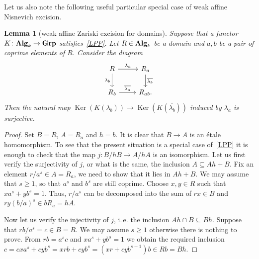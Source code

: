 \documentclass[oneside, 11pt]{amsart} \pdfoutput=1
\newcommand{\Ker}{\mathop{\mathrm{Ker}}\nolimits}
\numberwithin{equation}{section}
\newtheorem{lemma}{Lemma} \numberwithin{lemma}{section}
\theoremstyle{definition}
\newcommand{\catname}[1]{{\normalfont\textbf{#1}}} %
\begin{document}
Let us also note the following useful particular special case of weak affine Nisnevich excision.
\begin{lemma}[weak affine Zariski excision for domains]
	\label{zgl} Suppose that a functor $K\colon \catname{Alg}_k \to \catname{Grp}$ satisfies~\ref{LPP}. Let $R \in \catname{Alg}_k$ be a domain and $a, b$ be a pair of coprime elements of $R$. Consider the diagram
$$\begin{tikzcd}
	R \ar{r}{\lambda_a} \ar{d}[swap]{\lambda_b} & R_a \ar{d}{\overline{\lambda_b}}\\
	R_b \ar{r}{\overline{\lambda_a}} & R_{ab}.
\end{tikzcd}$$
	Then the natural map $\Ker(K(\lambda_b)) \to \Ker(K(\overline{\lambda_b}))$ induced by $\lambda_a$ is surjective.
\end{lemma}
\begin{proof}
	Set $B=R$, $A=R_a$ and $h=b$. It is clear that $B \to A$ is an {\'e}tale homomorphism. To see that the present situation is a special case of~\ref{LPP} it is enough to  check that the map $j\colon B/hB \to A/hA$ is an isomorphism. Let us first verify the surjectivity of $j$, or what is the same, the inclusion $A \subseteq Ah+B$. Fix an element $r/a^s\in A=R_a$, we need to show that it lies in $Ah+B$. We may assume that $s\geq 1$, so that $a^s$ and $b^s$ are still coprime. Choose $x, y \in R$ such that $xa^s+yb^s=1$. Thus, $r/a^s$ can be decomposed into the sum of $rx\in B$ and $ry(b/a)^s\in bR_a=hA$.

	Now let us verify the injectivity of $j$, i.\,e. the inclusion $Ah\cap B \subseteq Bh$. Suppose that $rb/a^s=c\in B=R$. We may assume $s\geq 1$ otherwise there is nothing to prove. From $rb=a^sc$ and $xa^s+yb^s=1$ we obtain the required inclusion $c=cxa^s+cyb^s=xrb+cyb^s=(xr+cyb^{s-1})b \in Rb = Bh$. 
\end{proof}
\end{document}
